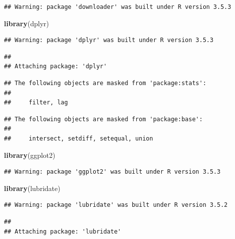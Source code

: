 \documentclass[]{article}
\newenvironment{Shaded}{\begin{snugshade}}{\end{snugshade}}
\newcommand{\KeywordTok}[1]{\textcolor[rgb]{0.13,0.29,0.53}{\textbf{#1}}}
\newcommand{\NormalTok}[1]{#1}
\begin{document}
\begin{verbatim}
## Warning: package 'downloader' was built under R version 3.5.3
\end{verbatim}

\begin{Shaded}
\begin{Highlighting}[]
\KeywordTok{library}\NormalTok{(dplyr)}
\end{Highlighting}
\end{Shaded}

\begin{verbatim}
## Warning: package 'dplyr' was built under R version 3.5.3
\end{verbatim}

\begin{verbatim}
## 
## Attaching package: 'dplyr'
\end{verbatim}

\begin{verbatim}
## The following objects are masked from 'package:stats':
## 
##     filter, lag
\end{verbatim}

\begin{verbatim}
## The following objects are masked from 'package:base':
## 
##     intersect, setdiff, setequal, union
\end{verbatim}

\begin{Shaded}
\begin{Highlighting}[]
\KeywordTok{library}\NormalTok{(ggplot2)}
\end{Highlighting}
\end{Shaded}

\begin{verbatim}
## Warning: package 'ggplot2' was built under R version 3.5.3
\end{verbatim}

\begin{Shaded}
\begin{Highlighting}[]
\KeywordTok{library}\NormalTok{(lubridate)}
\end{Highlighting}
\end{Shaded}

\begin{verbatim}
## Warning: package 'lubridate' was built under R version 3.5.2
\end{verbatim}

\begin{verbatim}
## 
## Attaching package: 'lubridate'
\end{verbatim}
\end{document}
